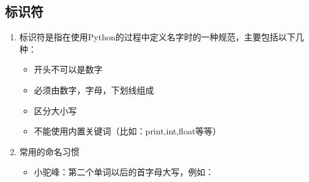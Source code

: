 
\subsection{标识符}

\begin{enumerate}
\item 标识符是指在使用Python的过程中定义名字时的一种规范，主要包括以下几种：
\begin{itemize}
\item 开头不可以是数字
\item 必须由数字，字母，下划线组成
\item 区分大小写
\item 不能使用内置关键词（比如：print,int,float等等）
\end{itemize}
\item 常用的命名习惯
\begin{itemize}
\item 小驼峰：第二个单词以后的首字母大写，例如：
\end{itemize}
\end{enumerate}